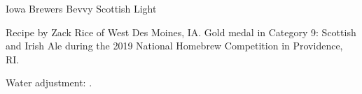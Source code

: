 \begin{recipe}{Iowa Brewers Bevvy Scottish Light} %

\begin{aboutblock}
Recipe by Zack Rice of West Des Moines, IA. Gold medal in Category 9: Scottish
and Irish Ale during the 2019 National Homebrew Competition in Providence, RI.
\sourceaha
\end{aboutblock}


\begin{methodandtiming}
 
\begin{mashsteps}
\end{mashsteps}

\begin{fermentationsteps}
\end{fermentationsteps}

\begin{directions}
Water adjustment: .
\end{directions}

\end{methodandtiming}

\recipebreak

\begin{ingredientsblock}

\begin{malts}
\end{malts}

\begin{hops}
\end{hops}


\end{ingredientsblock}

\end{recipe}

